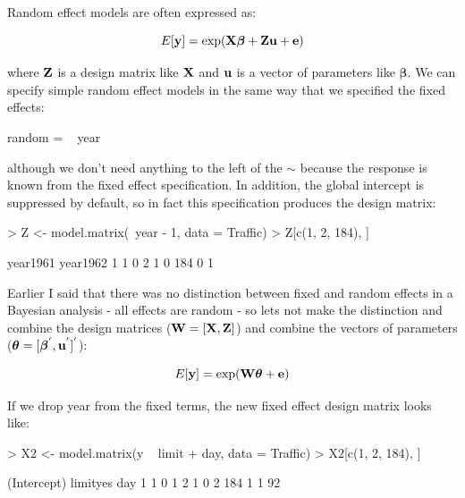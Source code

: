 \documentclass{article}
\begin{document}
Random effect models are often expressed as:

\begin{equation}
E[{\bf y}] = \textrm{exp}({\bf X}{\bm \beta}+{\bf Z}{\bf u}+{\bf e})
\end{equation}

where ${\bf Z}$ is a design matrix like ${\bf X}$ and ${\bf u}$ is a vector of parameters like ${\bm \beta}$. We can specify simple random effect models in the same way that we specified the fixed effects:

\begin{Schunk}
\begin{Soutput}
random =  ~ year
\end{Soutput}
\end{Schunk}

although we don't need anything to the left of the $\sim$ because the response is known from the fixed effect specification. In addition, the global intercept is suppressed by default, so in fact this specification produces the design matrix:

\begin{Schunk}
\begin{Sinput}
> Z <- model.matrix(~year - 1, data = Traffic)
> Z[c(1, 2, 184), ]
\end{Sinput}
\begin{Soutput}
    year1961 year1962
1          1        0
2          1        0
184        0        1
\end{Soutput}
\end{Schunk}

Earlier I said that there was no distinction between fixed and random effects in a Bayesian analysis - all effects are random - so lets not make the distinction and combine the design matrices (${\bf W} = [{\bf X}, {\bf Z}]$) and combine the vectors of parameters (${\bm \theta} = [{\bm \beta}^{'}, {\bf u}^{'}]^{'}$):

\begin{equation}
E[{\bf y}] = \textrm{exp}({\bf W}{\bm \theta}+{\bf e})
\label{MM-eq}
\end{equation}

If we drop year from the fixed terms, the new fixed effect design matrix looks like:

\begin{Schunk}
\begin{Sinput}
> X2 <- model.matrix(y ~ limit + day, data = Traffic)
> X2[c(1, 2, 184), ]
\end{Sinput}
\begin{Soutput}
    (Intercept) limityes day
1             1        0   1
2             1        0   2
184           1        1  92
\end{Soutput}
\end{Schunk}
\end{document}
